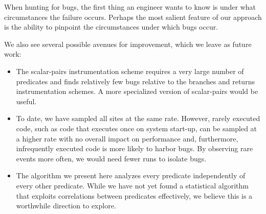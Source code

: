 \documentclass{sig-alternate}
\begin{document}
When hunting for bugs, the first thing an engineer wants to know is
under what circumstances the failure occurs.  Perhaps the most salient
feature of our approach is the ability to pinpoint the circumstances
under which bugs occur.

We also see several possible avenues for improvement, which we leave
as future work:
\begin{itemize}

\item The scalar-pairs instrumentation scheme requires a very large number
of predicates and finds relatively few bugs relative to the branches and
returns instrumentation schemes.  A more specialized version of scalar-pairs
would be useful.

\item To date, we have sampled all sites at the same rate.  However,
rarely executed code, such as code that executes once on system start-up,
can be sampled at a higher rate with no overall impact on performance and,
furthermore, infrequently executed code is more likely
to harbor bugs.  By observing rare events more often, we would need fewer
runs to isolate bugs.

\item The algorithm we present here analyzes every predicate independently
of every other predicate.  While we have not yet found a statistical algorithm that exploits
correlations between predicates effectively, we believe this is a worthwhile direction
to explore.
\end{itemize}



\end{document}
